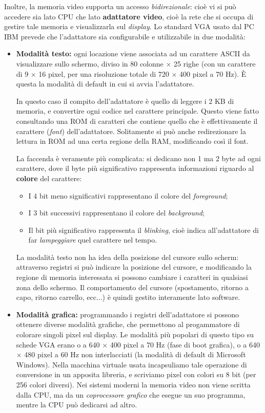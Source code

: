 \documentclass[a4paper,11pt]{article}
\begin{document}
Inoltre, la memoria video supporta un accesso \textit{bidirezionale}: cioè vi si può accedere sia lato CPU che lato \textbf{adattatore video}, cioè la rete che si occupa di gestire tale memoria e visualizzarla sul \textit{display}.
Lo standard VGA usato dal PC IBM prevede che l'adattatore sia configurabile e utilizzabile in due modalità:
\begin{itemize}
	\item \textbf{Modalità testo:} ogni locazione viene associata ad un carattere ASCII da visualizzare sullo schermo, diviso in 80 colonne $\times$ 25 righe (con un carattere di 9 $\times$ 16 pixel, per una risoluzione totale di 720 $\times$ 400 pixel a 70 Hz). È questa la modalità di default in cui si avvia l'adattatore.

		In questo caso il compito dell'adattatore è quello di leggere i 2 KB di memoria, e convertire ogni codice nel carattere principale.
		Questo viene fatto consultando una ROM di caratteri che contiene quello che è effettivamente il carattere (\textit{font}) dell'adattatore.
		Solitamente si può anche redirezionare la lettura in ROM ad una certa regione della RAM, modificando così il font.

		La faccenda è veramente più complicata: si dedicano non 1 ma 2 byte ad ogni carattere, dove il byte più significativo rappresenta informazioni riguardo al \textbf{colore} del carattere:
		\begin{itemize}
			\item I 4 bit meno significativi rappresentano il colore del \textit{foreground};
			\item I 3 bit successivi rappresentano il colore del \textit{background};
				\item Il bit più significativo rappresenta il \textit{blinking}, cioè indica all'adattatore di far \textit{lampeggiare} quel carattere nel tempo.
		\end{itemize}

		La modalità testo non ha idea della posizione del cursore sullo scherm: attraverso registri si può indicare la posizione del cursore, e modificando la regione di memoria interessata si possono cambiare i caratteri in qualsiasi zona dello schermo.
		Il comportamento del cursore (spostamento, ritorno a capo, ritorno carrello, ecc...) è quindi gestito interamente lato software.
	\item \textbf{Modalità grafica:} programmando i registri dell'adattatore si possono ottenere diverse modalità grafiche, che permettono al progammatore di colorare singoli pixel sul display.
		Le modalità più popolari di questo tipo su schede VGA erano o a 640 $\times$ 400 pixel a 70 Hz (fase di boot grafica), o a 640 $\times$ 480 pixel a 60 Hz non interlacciati (la modalità di default di Microsoft Windows). 
	Nella macchina virtuale usata incapsuliamo tale operazione di conversione in un apposita libreria, e scriviamo pixel con colori su 8 bit (per 256 colori diversi).
	Nei sistemi moderni la memoria video non viene scritta dalla CPU, ma da un \textit{coprocessore grafico} che esegue un suo programma, mentre la CPU può dedicarsi ad altro.	
\end{itemize}
\end{document}
